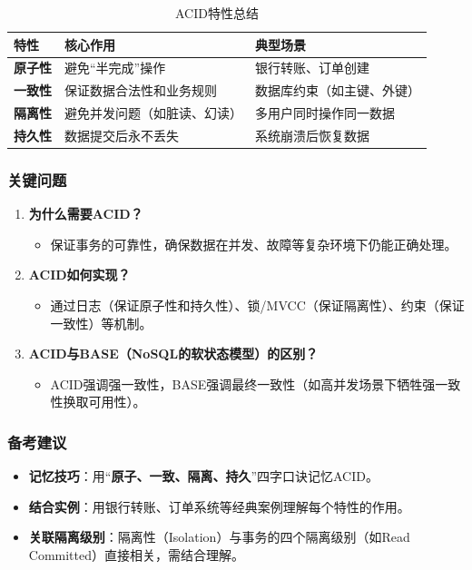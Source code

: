 \documentclass[a4paper,12pt,UTF8,fontset=none]{ctexart}
\begin{document}
\begin{table}[h!]
    \centering
    \caption{ACID特性总结}
    \begin{tabular}{@{}>{\centering\arraybackslash}m{3cm}%
                        >{\arraybackslash}m{6cm}%
                        >{\arraybackslash}m{6cm}@{}}
        \toprule
        \textbf{特性}   & \textbf{核心作用}         & \textbf{典型场景}                \\
        \midrule
        \textbf{原子性} & 避免“半完成”操作         & 银行转账、订单创建               \\
        \textbf{一致性} & 保证数据合法性和业务规则 & 数据库约束（如主键、外键）       \\
        \textbf{隔离性} & 避免并发问题（如脏读、幻读） & 多用户同时操作同一数据           \\
        \textbf{持久性} & 数据提交后永不丢失       & 系统崩溃后恢复数据               \\
        \bottomrule
    \end{tabular}
    
\end{table}

\subsubsection{关键问题}

\begin{enumerate}
    \item \textbf{为什么需要ACID？}
    \begin{itemize}
        \item 保证事务的可靠性，确保数据在并发、故障等复杂环境下仍能正确处理。
    \end{itemize}
    \item \textbf{ACID如何实现？}
    \begin{itemize}
        \item 通过日志（保证原子性和持久性）、锁/MVCC（保证隔离性）、约束（保证一致性）等机制。
    \end{itemize}
    \item \textbf{ACID与BASE（NoSQL的软状态模型）的区别？}
    \begin{itemize}
        \item ACID强调强一致性，BASE强调最终一致性（如高并发场景下牺牲强一致性换取可用性）。
    \end{itemize}
\end{enumerate}

\subsubsection{备考建议}
\begin{itemize}
    \item \textbf{记忆技巧}：用“\textbf{原子、一致、隔离、持久}”四字口诀记忆ACID。
    \item \textbf{结合实例}：用银行转账、订单系统等经典案例理解每个特性的作用。
    \item \textbf{关联隔离级别}：隔离性（Isolation）与事务的四个隔离级别（如Read Committed）直接相关，需结合理解。
\end{itemize}
\end{document}
